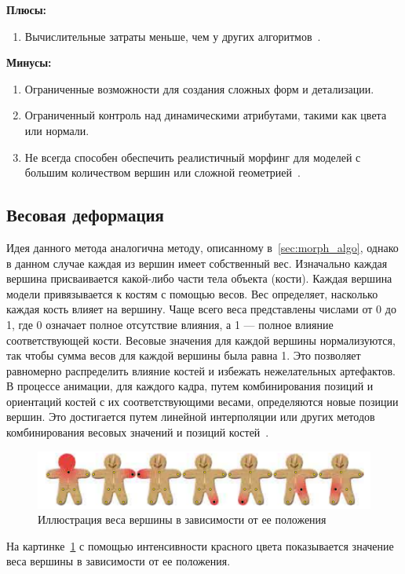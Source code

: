 \newpage

\textbf{Плюсы:}
\begin{enumerate}
	\item Вычислительные затраты меньше, чем у других алгоритмов~\cite{morphing_methods}.
\end{enumerate}

\textbf{Минусы:}
\begin{enumerate}
	\item Ограниченные возможности для создания сложных форм и детализации.
	\item Ограниченный контроль над динамическими атрибутами, такими как цвета или нормали.
	\item Не всегда способен обеспечить реалистичный морфинг для моделей с большим количеством вершин или сложной геометрией~\cite{morphing_methods}.
\end{enumerate}


\subsection{Весовая деформация}
Идея данного метода аналогична методу, описанному в~\ref{sec:morph_algo}, однако в данном случае каждая из вершин имеет собственный вес.
Изначально каждая вершина присваивается какой-либо части тела объекта (кости). 
Каждая вершина модели привязывается к костям с помощью весов. 
Вес определяет, насколько каждая кость влияет на вершину. 
Чаще всего веса представлены числами от 0 до 1, где 0 означает полное отсутствие влияния, а 1 --- полное влияние соответствующей кости. 
Весовые значения для каждой вершины нормализуются, так чтобы сумма весов для каждой вершины была равна 1. 
Это позволяет равномерно распределить влияние костей и избежать нежелательных артефактов. 
В процессе анимации, для каждого кадра, путем комбинирования позиций и ориентаций костей с их соответствующими весами, определяются новые позиции вершин.
Это достигается путем линейной интерполяции или других методов комбинирования весовых значений и позиций костей~\cite{weight_morphing}.

\begin{figure}[h]
	\centering
	\includegraphics[scale=0.8]{images/stickman_weights.png}
	\caption{Иллюстрация веса вершины в зависимости от ее положения}
	\label{fig:stickman_weights}
\end{figure}
На картинке~\ref{fig:stickman_weights} с помощью интенсивности красного цвета показывается значение веса вершины в зависимости от ее положения.

